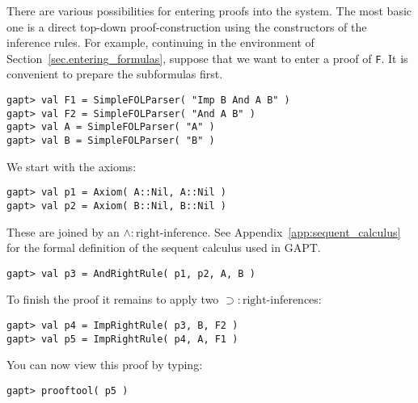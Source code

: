 \documentclass[a4paper,11pt]{article}
\newcommand{\impl}{\supset} %
\renewcommand{\land}{\wedge}
\begin{document}
There are various possibilities for entering proofs into the system. The most
basic one is a direct top-down proof-construction using the constructors
of the inference rules. For example, continuing in the environment of
Section~\ref{sec.entering_formulas}, suppose that we want to enter a
proof of \texttt{F}. It is convenient to prepare the subformulas first.
\begin{lstlisting}
gapt> val F1 = SimpleFOLParser( "Imp B And A B" )
gapt> val F2 = SimpleFOLParser( "And A B" )
gapt> val A = SimpleFOLParser( "A" )
gapt> val B = SimpleFOLParser( "B" )
\end{lstlisting}
%
We start with the axioms:
%
\begin{lstlisting}
gapt> val p1 = Axiom( A::Nil, A::Nil )
gapt> val p2 = Axiom( B::Nil, B::Nil )
\end{lstlisting}
%
These are joined by an $\land:\mathrm{right}$-inference. See Appendix~\ref{app:sequent_calculus}
for the formal definition of the sequent calculus used in GAPT.
%
\begin{lstlisting}
gapt> val p3 = AndRightRule( p1, p2, A, B )
\end{lstlisting}
%
To finish the proof it remains to apply two $\impl:\mathrm{right}$-inferences:
%
\begin{lstlisting}
gapt> val p4 = ImpRightRule( p3, B, F2 )
gapt> val p5 = ImpRightRule( p4, A, F1 )
\end{lstlisting}
%
You can now view this proof by typing:
\begin{lstlisting}
gapt> prooftool( p5 )
\end{lstlisting}
\end{document}
